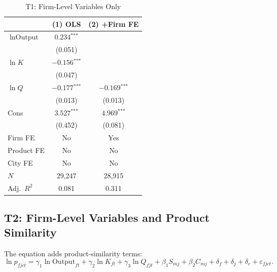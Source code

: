 \documentclass[12pt]{article}
\newcommand{\sym}[1]{\ensuremath{^{\text{#1}}}}
\newcommand{\se}[1]{{\small(#1)}}
\newcommand{\abs}{\textemdash}
\begin{document}
\begin{table}[H]
  \centering
  \caption{T1: Firm-Level Variables Only}
  \label{tab:t1}
  \begin{threeparttable}
    \begin{tabular}{lcc}
      \toprule
      & (1) OLS & (2) +Firm FE \\
      \midrule
      \(\ln \text{Output}\) & \(0.234\sym{***}\) & \abs \\
                             & \se{0.051}         & \\[4pt]
      \(\ln K\)              & \(-0.156\sym{***}\) & \abs \\
                             & \se{0.047}          & \\[4pt]
      \(\ln Q\)              & \(-0.177\sym{***}\) & \(-0.169\sym{***}\) \\
                             & \se{0.013}          & \se{0.013} \\[4pt]
      Cons               & \(3.527\sym{***}\) & \(4.969\sym{***}\) \\
                             & \se{0.452}         & \se{0.081} \\
      \midrule
      Firm FE     & No  & Yes \\
      Product FE  & No  & No  \\
      City FE     & No  & No  \\
      \(N\)       & 29,247 & 28,915 \\
      Adj.\ \(R^2\) & 0.081 & 0.311 \\
      \bottomrule
    \end{tabular}
  \end{threeparttable}
\end{table}

\subsection{T2: Firm-Level Variables and Product Similarity}
\label{sec:t2}

The equation adds product-similarity terms:
\begin{equation}
  \ln p_{fjct}
  = \gamma_1 \ln \text{Output}_{ft}
  + \gamma_2 \ln K_{ft}
  + \gamma_3 \ln Q_{fjt}
  + \beta_1 S_{mj}
  + \beta_2 C_{mj}
  + \delta_f + \delta_j + \delta_c
  + \varepsilon_{fjct}.
  \label{eq:t2}
\end{equation}
\end{document}
